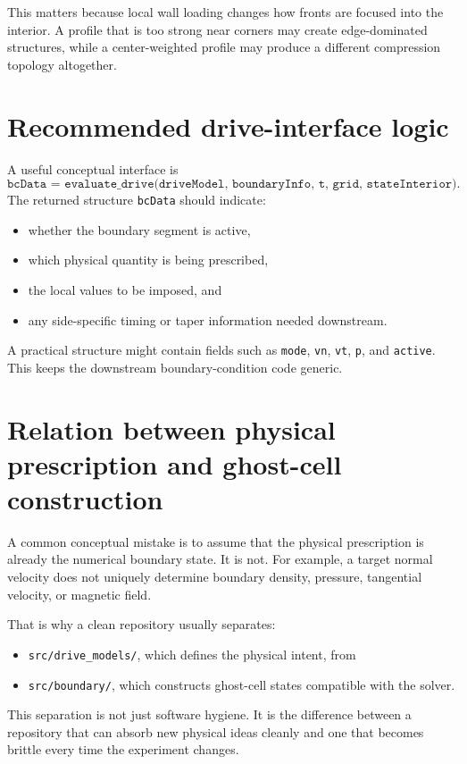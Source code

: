 \documentclass[11pt]{article}
\begin{document}
This matters because local wall loading changes how fronts are focused into the interior. A profile that is too strong near corners may create edge-dominated structures, while a center-weighted profile may produce a different compression topology altogether.

\section{Recommended drive-interface logic}
A useful conceptual interface is
\[
\texttt{bcData = evaluate\_drive(driveModel, boundaryInfo, t, grid, stateInterior)}.
\]
The returned structure \texttt{bcData} should indicate:
\begin{itemize}
    \item whether the boundary segment is active,
    \item which physical quantity is being prescribed,
    \item the local values to be imposed, and
    \item any side-specific timing or taper information needed downstream.
\end{itemize}

A practical structure might contain fields such as
\texttt{mode}, \texttt{vn}, \texttt{vt}, \texttt{p}, and \texttt{active}. This keeps the downstream boundary-condition code generic.

\section{Relation between physical prescription and ghost-cell construction}
A common conceptual mistake is to assume that the physical prescription is already the numerical boundary state. It is not. For example, a target normal velocity does not uniquely determine boundary density, pressure, tangential velocity, or magnetic field.

That is why a clean repository usually separates:
\begin{itemize}
    \item \texttt{src/drive\_models/}, which defines the physical intent, from
    \item \texttt{src/boundary/}, which constructs ghost-cell states compatible with the solver.
\end{itemize}

This separation is not just software hygiene. It is the difference between a repository that can absorb new physical ideas cleanly and one that becomes brittle every time the experiment changes.
\end{document}
